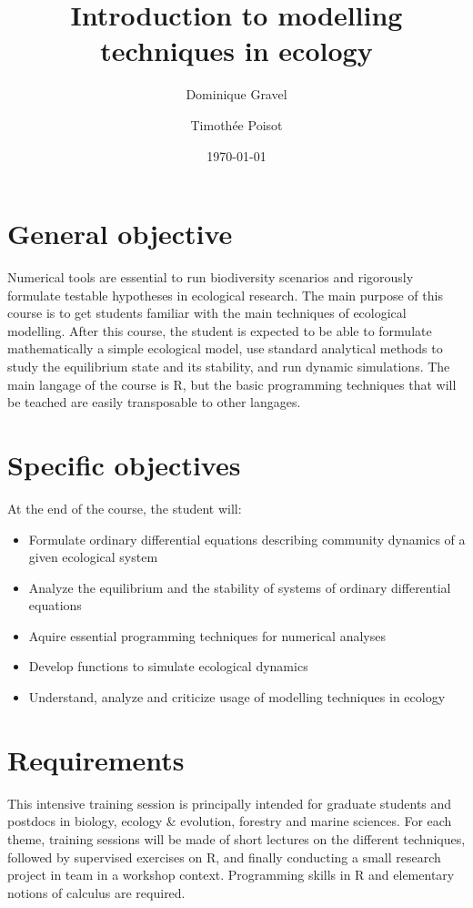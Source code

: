 \documentclass[11]{article}
\title{Introduction to modelling techniques in ecology}
\date {\today}
\author[1,2] {Dominique Gravel}
\author[1] {Timothée Poisot}
\affil[1] {Département de biologie, chimie et géographie, Université du Québec à Rimouski. 1-418-736-8458 \#1752}
\affil[2] {\url{dominique_gravel@uqar.ca}}
\begin{document}
	\maketitle

	\section*{General objective}
	Numerical tools are essential to run biodiversity scenarios and rigorously formulate testable hypotheses in ecological research. The main purpose of this course is to get students familiar with the main techniques of ecological modelling. After this course, the student is expected to be able to formulate mathematically a simple ecological model, use standard analytical methods to study the equilibrium state and its stability, and run dynamic simulations. The main langage of the course is R, but the basic programming techniques that will be teached are easily transposable to other langages.  

	\section*{Specific objectives}
At the end of the course, the student will:
\begin{itemize}
\item Formulate ordinary differential equations describing community dynamics of a given ecological system
\item Analyze the equilibrium and the stability of systems of ordinary differential equations
\item Aquire essential programming techniques for numerical analyses 
\item Develop functions to simulate ecological dynamics
\item Understand, analyze and criticize usage of modelling techniques in ecology
\end{itemize}

	\section*{Requirements}
This intensive training session is principally intended for graduate students and postdocs in biology, ecology \& evolution, forestry and marine sciences. For each theme, training sessions will be made of short lectures on the different techniques, followed by supervised exercises on R, and finally conducting a small research project in team in a workshop context. Programming skills in R and elementary notions of calculus are required.
\end{document}
